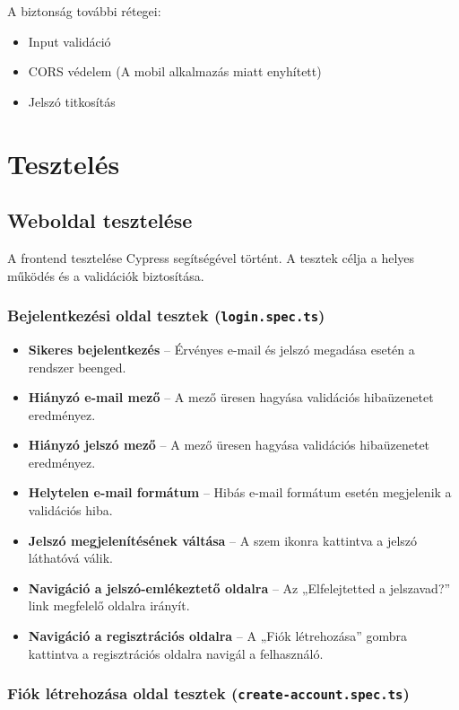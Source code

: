 \documentclass[12pt]{report}
\begin{document}
A biztonság további rétegei:
\begin{itemize}
  \item Input validáció
  \item CORS védelem (A mobil alkalmazás miatt enyhített)
  \item Jelszó titkosítás
\end{itemize}

\chapter{Tesztelés}
\section{Weboldal tesztelése}
A frontend tesztelése Cypress segítségével történt. A tesztek célja a helyes működés és a validációk biztosítása.

\subsection{Bejelentkezési oldal tesztek (\texttt{login.spec.ts})}

\begin{itemize}
  \item \textbf{Sikeres bejelentkezés} – Érvényes e-mail és jelszó megadása esetén a rendszer beenged.
  \item \textbf{Hiányzó e-mail mező} – A mező üresen hagyása validációs hibaüzenetet eredményez.
  \item \textbf{Hiányzó jelszó mező} – A mező üresen hagyása validációs hibaüzenetet eredményez.
  \item \textbf{Helytelen e-mail formátum} – Hibás e-mail formátum esetén megjelenik a validációs hiba.
  \item \textbf{Jelszó megjelenítésének váltása} – A szem ikonra kattintva a jelszó láthatóvá válik.
  \item \textbf{Navigáció a jelszó-emlékeztető oldalra} – Az „Elfelejtetted a jelszavad?” link megfelelő oldalra irányít.
  \item \textbf{Navigáció a regisztrációs oldalra} – A „Fiók létrehozása” gombra kattintva a regisztrációs oldalra navigál a felhasználó.
\end{itemize}

\subsection{Fiók létrehozása oldal tesztek (\texttt{create-account.spec.ts})}
\end{document}

